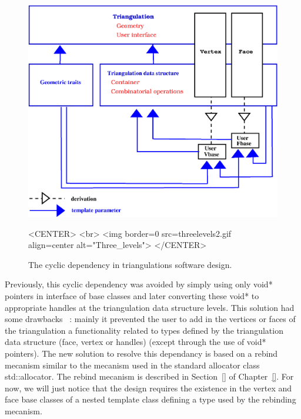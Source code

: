 \begin{figure}
\begin{ccTexOnly}
\begin{center}
\includegraphics[width=13cm]{threelevels2.eps}
\end{center}
\end{ccTexOnly}
\caption{The cyclic dependency in triangulations software design.
\label{I1_Fig_three_levels_2}}
\begin{ccHtmlOnly}
<CENTER>
<br>
<img border=0 src=threelevels2.gif align=center alt="Three_levels">
</CENTER>
\end{ccHtmlOnly}
\end{figure}

Previously, this cyclic dependency was avoided by simply
using only void* pointers in interface of base classes
and later converting these void* to appropriate handles at the
triangulation data structure levels. This solution had some drawbacks
~: mainly it prevented the user to add in the vertices or faces of the 
triangulation a functionality related to types defined by 
the triangulation data structure (face, vertex or handles)
(except through the use of void* pointers).
The new solution to resolve this dependancy
is based on a rebind mecanism similar to the mecanism used in the 
standard allocator class std::allocator. The rebind mecanism
is described in Section~\ref{} of Chapter~\ref{}.
For now, we will just notice that the design
requires
the existence in the vertex and face base classes 
of a nested template class
 defining a type  used by
the rebinding mecanism.


